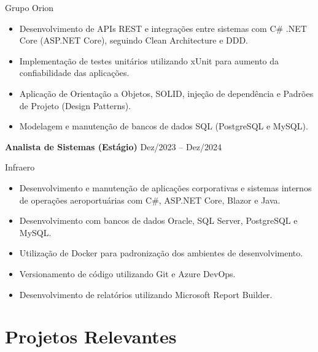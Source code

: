 \documentclass[11pt,a4paper]{article}
\begin{document}
Grupo Orion

\begin{itemize}[leftmargin=*,noitemsep,topsep=2pt]

\item Desenvolvimento de APIs REST e integrações entre sistemas com C\# .NET Core (ASP.NET Core), seguindo Clean Architecture e DDD.

\item Implementação de testes unitários utilizando xUnit para aumento da confiabilidade das aplicações.

\item Aplicação de Orientação a Objetos, SOLID, injeção de dependência e Padrões de Projeto (Design Patterns).

\item Modelagem e manutenção de bancos de dados SQL (PostgreSQL e MySQL).

\end{itemize}

\vspace{0.2cm}

\textbf{Analista de Sistemas (Estágio)}
\hfill Dez/2023 -- Dez/2024

Infraero

\begin{itemize}[leftmargin=*,noitemsep,topsep=2pt]

\item Desenvolvimento e manutenção de aplicações corporativas e sistemas internos de operações aeroportuárias com C\#, ASP.NET Core, Blazor e Java.

\item Desenvolvimento com bancos de dados Oracle, SQL Server, PostgreSQL e MySQL.

\item Utilização de Docker para padronização dos ambientes de desenvolvimento.

\item Versionamento de código utilizando Git e Azure DevOps.

\item Desenvolvimento de relatórios utilizando Microsoft Report Builder.

\end{itemize}

\section{Projetos Relevantes}
\end{document}
